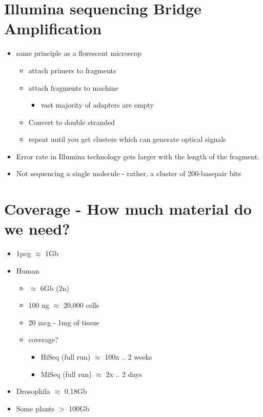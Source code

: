 \documentclass{article}
\begin{document}
    \section{Illumina sequencing Bridge Amplification}
        \begin{itemize}
            \item same principle as a florescent microscop
            \begin{itemize}
                \item attach primers to fragments
                \item attach fragments to machine
                \begin{itemize}
                    \item vast majority of adapters are empty
                \end{itemize}
                \item Convert to double stranded
                \item repeat until you get clusters which can generate optical signals
            \end{itemize}
            \item Error rate in Illumina technology gets larger with the length of the fragment.
            \item Not sequencing a single molecule - rather, a cluster of 200-basepair bits
        \end{itemize}

    \section{Coverage - How much material do we need?}
        \begin{itemize}
            \item 1pcg $\approx$ 1Gb
            \item Human
            \begin{itemize}
                \item $\approx$ 6Gb (2n)
                \item 100 ng $\approx$ 20,000 cells
                \item 20 mcg - 1mg of tissue
                \item coverage?
                \begin{itemize}
                    \item HiSeq (full run) $\approx$ 100x .. 2 weeks
                    \item MiSeq (full run) $\approx$ 2x .. 2 days
                \end{itemize}
            \end{itemize}
            \item Drosophila $\approx$ 0.18Gb
            \item Some plants $>$ 100Gb
        \end{itemize}
\end{document}

